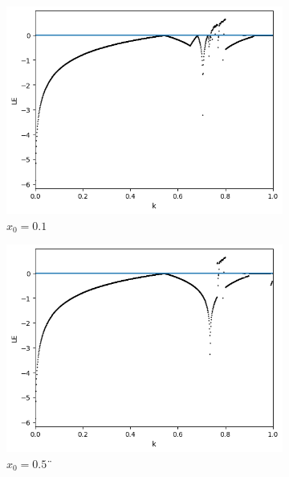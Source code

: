 \begin{figure}[h!]
	\centering

	\begin{subfigure}[b]{0.45\textwidth}
		\centering
		\includegraphics[width=\textwidth]{LateX images/graphs q14/g6}
		\caption{\(x_0=0.1\)}
		\label{f:g23}
	\end{subfigure}
	\hfill
	\begin{subfigure}[b]{0.45\textwidth}
		\centering
		\includegraphics[width=\textwidth]{LateX images/graphs q14/g7}
		\caption{\(x_0=0.5\)¨}
		\label{f:g24}
	\end{subfigure}
	\hfill
	\begin{subfigure}[b]{0.45\textwidth}
		\centering

\end{subfigure}
\end{figure}
